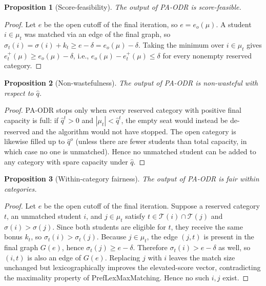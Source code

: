 \documentclass[10pt]{article}
\newtheorem{proposition}{Proposition}
\newcommand{\T}{\mathcal{T}}
\newcommand{\1}{\mathbf{1}}
\begin{document}
\begin{proposition}[Score-feasibility]\label{prop:pa-odr-score-feasible}
The output of PA-ODR is score-feasible.
\end{proposition}
\begin{proof}
Let $e$ be the open cutoff of the final iteration, so $e=e_o(\mu)$. A student $i\in\mu_t$ was matched via an edge of the final graph, so $\sigma_t(i)=\sigma(i)+k_t\ge e-\delta=e_o(\mu)-\delta$. Taking the minimum over $i\in\mu_t$ gives $e_t^+(\mu)\ge e_o(\mu)-\delta$, i.e., $e_o(\mu)-e_t^+(\mu)\le\delta$ for every nonempty reserved category.
\end{proof}

\begin{proposition}[Non-wastefulness]\label{prop:pa-odr-nonwaste}
The output of PA-ODR is non-wasteful with respect to $\hat q$.
\end{proposition}
\begin{proof}
PA-ODR stops only when every reserved category with positive final capacity is full: if $\hat q^t>0$ and $|\mu_t|<\hat q^t$, the empty seat would instead be de-reserved and the algorithm would not have stopped. The open category is likewise filled up to $\hat q^o$ (unless there are fewer students than total capacity, in which case no one is unmatched). Hence no unmatched student can be added to any category with spare capacity under $\hat q$.
\end{proof}

\begin{proposition}[Within-category fairness]\label{prop:pa-odr-within}
The output of PA-ODR is fair within categories.
\end{proposition}
\begin{proof}
Let $e$ be the open cutoff of the final iteration. Suppose a reserved category $t$, an unmatched student $i$, and $j\in\mu_t$ satisfy $t\in\T(i)\cap\T(j)$ and $\sigma(i)>\sigma(j)$. Since both students are eligible for $t$, they receive the same bonus $k_t$, so $\sigma_t(i)>\sigma_t(j)$. Because $j\in\mu_t$, the edge $(j,t)$ is present in the final graph $G(e)$, hence $\sigma_t(j)\ge e-\delta$. Therefore $\sigma_t(i)>e-\delta$ as well, so $(i,t)$ is also an edge of $G(e)$. Replacing $j$ with $i$ leaves the match size unchanged but lexicographically improves the elevated-score vector, contradicting the maximality property of PrefLexMaxMatching. Hence no such $i,j$ exist.
\end{proof}
\end{document}
